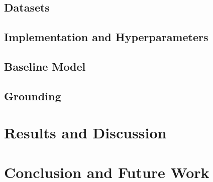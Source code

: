 \documentclass{article}
\begin{document}
\subsection{Datasets}

\subsection{Implementation and Hyperparameters}

\subsection{Baseline Model}

\subsection{Grounding}

\section{Results and Discussion}
\section{Conclusion and Future Work}


\end{document}
